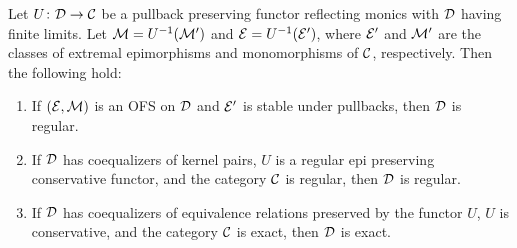 \begin{lemma}\label{lem:reflecting_regularity_exactness}
    Let $U\colon \mathcal{D}\to \mathcal{C}$ be a pullback preserving functor reflecting monics with $\mathcal{D}$ having finite limits. Let $\mathcal{M} = U^{-1}(\mathcal{M}')$ and $\mathcal{E} = U^{-1}(\mathcal{E}')$, where $\mathcal{E}'$ and $\mathcal{M}'$ are the classes of extremal epimorphisms and monomorphisms of $\mathcal{C}$, respectively. Then the following hold:
    \begin{enumerate}
        \item If $(\mathcal{E},\mathcal{M})$ is an OFS on $\mathcal{D}$ and $\mathcal{E}'$ is stable under pullbacks, then $\mathcal{D}$ is regular.
        \item If $\mathcal{D}$ has coequalizers of kernel pairs, $U$ is a regular epi preserving conservative functor, and the category $\mathcal{C}$ is regular, then $\mathcal{D}$ is regular.
        \item If $\mathcal{D}$ has coequalizers of equivalence relations preserved by the functor $U$, $U$ is conservative, and the category $\mathcal{C}$ is exact, then $\mathcal{D}$ is exact.
    \end{enumerate}
\end{lemma}
